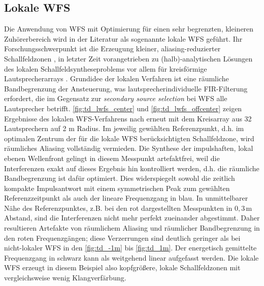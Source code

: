 \subsection{Lokale WFS}
%
Die Anwendung von WFS mit Optimierung für einen sehr
begrenzten, kleineren Zuhörerbereich wird in der Literatur als sogenannte
lokale WFS geführt.
%
Ihr Forschungsschwerpunkt ist die Erzeugung kleiner, aliasing-reduzierter
Schallfeldzonen \cite{Corteel2008_AES}, in letzter Zeit vorangetrieben zu
(halb)-analytischen Lösungen des lokalen Schallfeldsyntheseproblems vor allem für
kreisförmige Lautsprecherarrays \cite{Winter2019_diss,Hahn2019,Hahn2022_JAES}.
%
Grundidee der lokalen Verfahren ist eine räumliche Bandbegrenzung der Ansteuerung,
was lautsprecherindividuelle FIR-Filterung erfordert,
die im Gegensatz zur \textit{secondary source selection} bei WFS alle
Lautsprecher betrifft.
%
\Abb\ref{fig:td_lwfs_center} und \ref{fig:td_lwfs_offcenter} zeigen Ergebnisse
des lokalen WFS-Verfahrens nach \cite{Hahn2022_JAES} erneut mit dem Kreisarray aus
32 Lautsprechern auf 2 m Radius.
%
Im jeweilig gewählten Referenzpunkt,
d.h. im optimalen Zentrum der für die lokale WFS berücksichtigten Schallfeldzone,
wird räumliches Aliasing vollständig vermieden.
%
Die Synthese der impulshaften, lokal ebenen Wellenfront gelingt in diesem Messpunkt
artefaktfrei, weil die Interferenzen exakt auf dieses Ergebnis hin
kontrolliert werden, d.h. die räumliche Bandbegrenzung ist dafür optimiert.
%
Dies widerspiegelt sowohl die zeitlich kompakte Impulsantwort mit einem
symmetrischen Peak zum gewählten Referenzzeitpunkt als auch der lineare Frequenzgang
in blau.
%
In unmittelbarer Nähe des Referenzpunktes, z.B. bei den rot dargestellten Messpunkten
in $0{,}3$\,m Abstand, sind die Interferenzen nicht mehr perfekt zueinander abgestimmt.
%
Daher resultieren Artefakte von räumlichem Aliasing und räumlicher Bandbegrenzung
in den roten Frequenzgängen; diese
Verzerrungen sind deutlich geringer als bei nicht-lokaler WFS in den
\Abb\ref{fig:td_-1m} bis \ref{fig:td_1m}.
%
Der energetisch gemittelte Frequenzgang in schwarz kann als weitgehend linear
aufgefasst werden.
%
Die lokale WFS erzeugt in diesem Beispiel also kopfgrößere, lokale
Schallfeldzonen mit vergleichsweise wenig Klangverfärbung.
%
